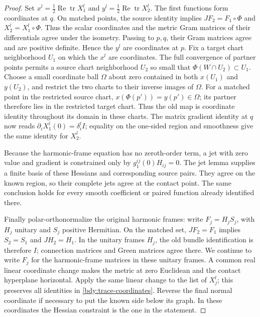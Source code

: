 \begin{proof}
Set \(x^l=\frac12\operatorname{Re}\operatorname{tr}X_1^l\) and
\(y^l=\frac12\operatorname{Re}\operatorname{tr}X_2^l\).  The first
functions form coordinates at \(q\).  On matched points, the
source identity implies \(JF_2=F_1\circ\Phi\) and
\(X_2^l=X_1^l\circ\Phi\).  Thus the scalar coordinates and the
metric Gram matrices of their differentials agree under the
isometry.  Passing to \(p,q\), their Gram matrices agree and are
positive definite.  Hence the \(y^l\) are coordinates at \(p\).
Fix a target chart neighborhood \(U_1\) on which the \(x^l\)
are coordinates.  The full convergence of partner points permits
a source chart neighborhood \(U_2\) so small that
\(\Phi(W\cap U_2)\subset U_1\).  Choose a small coordinate ball
\(\Omega\) about zero contained in both \(x(U_1)\) and
\(y(U_2)\), and restrict the two charts to their inverse images
of \(\Omega\).  For a matched point in the restricted source
chart, \(x(\Phi(p'))=y(p')\in\Omega\); its partner therefore
lies in the restricted target chart.  Thus the old map is
coordinate identity throughout its domain in these charts.  The
matrix gradient identity at
\(q\) now reads \(\partial_iX_1^l(0)=\delta_i^lI\); equality on
the one-sided region and smoothness give the same identity for
\(X_2^l\).

Because the harmonic-frame equation has no zeroth-order term,
a jet with zero value and gradient is constrained only by
\(g_1^{ij}(0)H_{ij}=0\).  The jet lemma supplies a finite basis
of these Hessians and corresponding source pairs.  They agree
on the known region, so their complete jets agree at the contact
point.  The same conclusion holds for every smooth coefficient
or paired function already identified there.

Finally polar-orthonormalize the original harmonic frames:
write \(F_j=H_jS_j\), with \(H_j\) unitary and \(S_j\) positive
Hermitian.  On the matched set, \(JF_2=F_1\) implies
\(S_2=S_1\) and \(JH_2=H_1\).  In the unitary frames \(H_j\),
the old bundle identification is therefore \(I\); connection
matrices and Green matrices agree there.  We continue to write
\(F_j\) for the harmonic-frame matrices in these unitary frames.
A common real linear coordinate change makes the metric at zero
Euclidean and the contact hyperplane horizontal.  Apply the same
linear change to the list of \(X_j^l\); this preserves all
identities in \eqref{bdy:trace-coordinates}.  Reverse the final
normal coordinate if necessary to put the known side below its
graph.  In these coordinates the Hessian constraint is the one
in the statement.
\end{proof}

